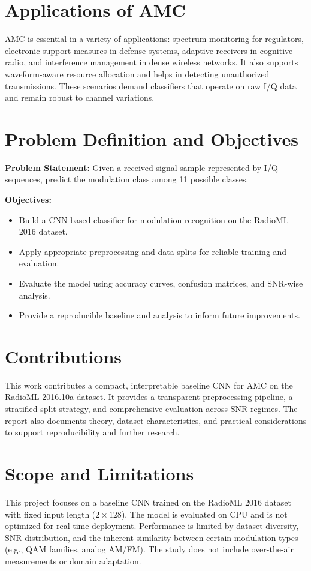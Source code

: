 \documentclass[12pt,a4paper]{report}
\begin{document}
\section{Applications of AMC}
AMC is essential in a variety of applications: spectrum monitoring for regulators, electronic support measures in defense systems, adaptive receivers in cognitive radio, and interference management in dense wireless networks. It also supports waveform-aware resource allocation and helps in detecting unauthorized transmissions. These scenarios demand classifiers that operate on raw I/Q data and remain robust to channel variations.

\section{Problem Definition and Objectives}
\textbf{Problem Statement:} Given a received signal sample represented by I/Q sequences, predict the modulation class among 11 possible classes.

\textbf{Objectives:}
\begin{itemize}
    \item Build a CNN-based classifier for modulation recognition on the RadioML 2016 dataset.
    \item Apply appropriate preprocessing and data splits for reliable training and evaluation.
    \item Evaluate the model using accuracy curves, confusion matrices, and SNR-wise analysis.
    \item Provide a reproducible baseline and analysis to inform future improvements.
\end{itemize}

\section{Contributions}
This work contributes a compact, interpretable baseline CNN for AMC on the RadioML 2016.10a dataset. It provides a transparent preprocessing pipeline, a stratified split strategy, and comprehensive evaluation across SNR regimes. The report also documents theory, dataset characteristics, and practical considerations to support reproducibility and further research.

\section{Scope and Limitations}
This project focuses on a baseline CNN trained on the RadioML 2016 dataset with fixed input length ($2 \times 128$). The model is evaluated on CPU and is not optimized for real-time deployment. Performance is limited by dataset diversity, SNR distribution, and the inherent similarity between certain modulation types (e.g., QAM families, analog AM/FM). The study does not include over-the-air measurements or domain adaptation.
\end{document}
